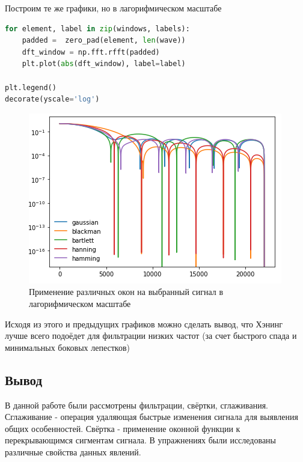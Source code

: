 Построим те же графики, но в лагорифмическом масштабе

\begin{lstlisting}[language=Python]
for element, label in zip(windows, labels):
    padded =  zero_pad(element, len(wave))
    dft_window = np.fft.rfft(padded)
    plt.plot(abs(dft_window), label=label)

plt.legend()
decorate(yscale='log')
\end{lstlisting}

\begin{figure}[H]
	\begin{center}
		\includegraphics[scale=1]{fig/lab08/lab08_09.png}
		\caption{Применение различных окон на выбранный сигнал в лагорифмическом масштабе}
	\end{center}
\end{figure}

Исходя из этого и предыдущих графиков можно сделать вывод, что Хэнинг лучше всего подоёдет для фильтрации низких частот (за счет быстрого спада и минимальных боковых лепестков)


\subsection{Вывод}

В данной работе были рассмотрены фильтрации, свёртки, сглаживания. Сглаживание - операция удаляющая быстрые изменения сигнала для выявления общих особенностей. Свёртка - применение оконной функции к перекрывающимся сигментам сигнала. В упражнениях были исследованы различные свойства данных явлений.
